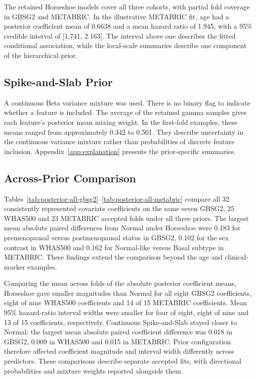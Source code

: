 The retained Horseshoe models cover all three cohorts, with partial fold coverage in GBSG2 and METABRIC. In the illustrative METABRIC fit, age had a posterior coefficient mean of 0.6638 and a mean hazard ratio of 1.945, with a 95\% credible interval of [1.741, 2.163]. The interval above one describes the fitted conditional association, while the local-scale summaries describe one component of the hierarchical prior.

\subsection{Spike-and-Slab Prior}\label{spike-and-slab-prior-1}

A continuous Beta variance mixture was used. There is no binary flag to indicate whether a feature is included. The average of the retained gamma samples gives each feature's posterior mean mixing weight. In the first-fold examples, these means ranged from approximately 0.342 to 0.501. They describe uncertainty in the continuous variance mixture rather than probabilities of discrete feature inclusion. Appendix~\ref{app:explanation} presents the prior-specific summaries.

\subsection{Across-Prior Comparison}

Tables~\ref{tab:posterior-all-gbsg2}--\ref{tab:posterior-all-metabric} compare all 32 consistently represented covariate coefficients on the same seven GBSG2, 25 WHAS500 and 23 METABRIC accepted folds under all three priors. The largest mean absolute paired differences from Normal under Horseshoe were 0.183 for premenopausal versus postmenopausal status in GBSG2, 0.102 for the sex contrast in WHAS500 and 0.162 for Normal-like versus Basal subtype in METABRIC. These findings extend the comparison beyond the age and clinical-marker examples.

Comparing the mean across folds of the absolute posterior coefficient means, Horseshoe gave smaller magnitudes than Normal for all eight GBSG2 coefficients, eight of nine WHAS500 coefficients and 14 of 15 METABRIC coefficients. Mean 95\% hazard-ratio interval widths were smaller for four of eight, eight of nine and 13 of 15 coefficients, respectively. Continuous Spike-and-Slab stayed closer to Normal: the largest mean absolute paired coefficient difference was 0.018 in GBSG2, 0.009 in WHAS500 and 0.015 in METABRIC. Prior configuration therefore affected coefficient magnitude and interval width differently across predictors. These comparisons describe separate accepted fits, with directional probabilities and mixture weights reported alongside them.

